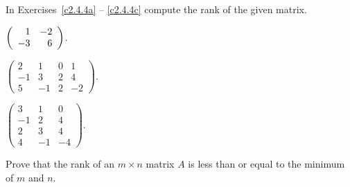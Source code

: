 \documentclass{ximera}
\begin{document}
\noindent In Exercises~\ref{c2.4.4a} -- \ref{c2.4.4c} compute the rank of
the given matrix.
\begin{exercise} \label{c2.4.4a}
$\left(\begin{array}{rr} 1 & -2\\ -3 &6\end{array}\right)$.
\end{exercise}
\begin{exercise} \label{c2.4.4b}
$\left(\begin{array}{rrrr} 2 & 1 & 0 & 1\\
	-1 & 3 & 2 & 4\\ 5 & -1 & 2 & -2\end{array}\right)$.
\end{exercise}
\begin{exercise} \label{c2.4.4c}
$\left(\begin{array}{rrr} 3 & 1 & 0 \\
	-1 & 2 & 4\\ 2 & 3 & 4 \\ 4 & -1 & -4 \end{array}\right)$.
\end{exercise}

\AEXER

\begin{exercise}
  Prove that the rank of an $m \times n$ matrix $A$ is less than or equal to
  the minimum of $m$ and $n$.
\end{exercise}
\end{document}
